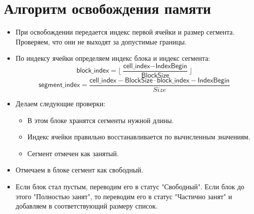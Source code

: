 \documentclass[12pt, a4paper]{article}
\begin{document}
	\section{Алгоритм освобождения памяти}

	\begin{itemize}
		\item При освобождении передается индекс первой ячейки и размер сегмента. Проверяем, что
		они не выходят за допустимые границы.
		
		\item По индексу ячейки определяем индекс блока и индекс сегмента:
		$$ \textsf{block\_index} = \lfloor \frac{\textsf{cell\_index} - \textsf{IndexBegin}}{\textsf{BlockSize}} \rfloor$$
		$$ \textsf{segment\_index} = \frac
			{\textsf{cell\_index} - \textsf{BlockSize} \cdot \textsf{block\_index} - \textsf{IndexBegin}}{Size} $$
		
		\item Делаем следующие проверки:
			\begin{itemize}
				 \item В этом блоке хранятся сегменты нужной длины.
				 \item Индекс ячейки правильно восстанавливается по вычисленным значениям.
				 \item Сегмент отмечен как занятый.
			\end{itemize}
		
		\item Отмечаем в блоке сегмент как свободный.
		
		\item Если блок стал пустым, переводим его в статус "Свободный". Если блок до этого "Полностью
		занят", то переводим его в статус "Частично занят" и добавляем в соответствующий размеру список.

	\end{itemize}
\end{document}
